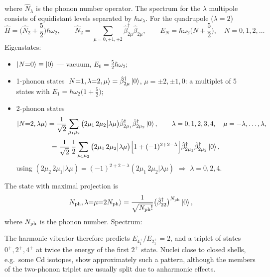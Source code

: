 \documentclass[11pt,a4paper]{article}
\newcommand{\op}[1]{\hat{#1}}
\begin{document}
where $\op N_\lambda$ is the phonon number operator. The spectrum for the $\lambda$ multipole consists of equidistant levels separated by $\hbar\omega_\lambda$. For the quadrupole ($\lambda=2$)
\[
\op H=\Big(\op N_2+\frac52\Big)\hbar\omega_2,\qquad \op N_2=\sum_{\mu=0,\pm1,\pm2}\op\beta^\dagger_{2\mu}\op\beta_{2\mu},
\qquad E_N=\hbar\omega_2\Big(N+\frac52\Big),\quad N=0,1,2,\dots
\]
Eigenstates:
\begin{itemize}
\item $\ket{N{=}0}\equiv\ket0$ --- vacuum, $E_0=\frac52\hbar\omega_2$;
\item 1-phonon states $\ket{N{=}1,\lambda{=}2,\mu}=\op\beta^\dagger_{2\mu}\ket0$, $\mu=\pm2,\pm1,0$: a multiplet of 5 states with $E_1=\hbar\omega_2\big(1+\frac52\big)$;
\item 2-phonon states
\[
\ket{N{=}2,\lambda\mu}=\frac{1}{\sqrt2}\sum_{\mu_1\mu_2}\big(2\mu_1\,2\mu_2\big|\lambda\mu\big)\op\beta^\dagger_{2\mu_1}\op\beta^\dagger_{2\mu_2}\ket0,
\qquad \lambda=0,1,2,3,4,\quad \mu=-\lambda,\dots,\lambda,
\]
\[
=\frac{1}{\sqrt2}\,\frac12\sum_{\mu_1\mu_2}\big(2\mu_1\,2\mu_2\big|\lambda\mu\big)\Big[1+(-1)^{2+2-\lambda}\Big]\op\beta^\dagger_{2\mu_1}\op\beta^\dagger_{2\mu_2}\ket0,
\]
using $(2\mu_2\,2\mu_1|\lambda\mu)=(-1)^{2+2-\lambda}(2\mu_1\,2\mu_2|\lambda\mu)$ $\Rightarrow$ $\lambda=0,2,4$.
\end{itemize}
The state with maximal projection is
\[
\ket{N_{\rm ph},\lambda{=}\mu{=}2N_{\rm ph}}=\frac{1}{\sqrt{N_{\rm ph}!}}\big(\op\beta^\dagger_{22}\big)^{N_{\rm ph}}\ket0,
\]
where $N_{\rm ph}$ is the phonon number. Spectrum:
\begin{center}
\end{center}

The harmonic vibrator therefore predicts $E_{4^+_1}/E_{2^+_1}=2$, and a triplet of states $0^+,2^+,4^+$ at twice the energy of the first $2^+$ state. Nuclei close to closed shells, e.g.\ some Cd isotopes, show approximately such a pattern, although the members of the two-phonon triplet are usually split due to anharmonic effects.
\end{document}

